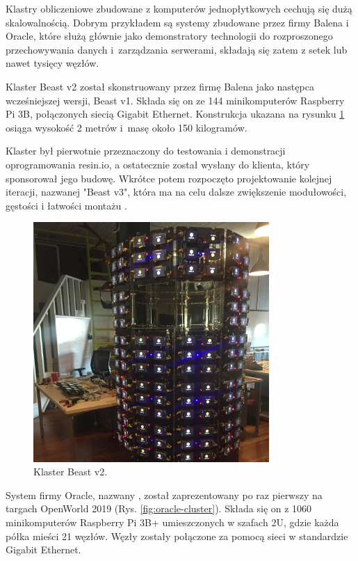 Klastry obliczeniowe zbudowane z komputerów jednopłytkowych cechują się dużą skalowalnością.
Dobrym przykładem są systemy zbudowane przez firmy Balena i Oracle, które służą głównie jako
demonstratory technologii do rozproszonego przechowywania danych i~zarządzania serwerami,
składają się zatem z setek lub nawet tysięcy węzłów.

Klaster Beast v2 został skonstruowany przez firmę Balena jako następca wcześniejszej wersji,
Beast v1. Składa się on ze 144 minikomputerów Raspberry Pi 3B, połączonych siecią Gigabit
Ethernet. Konstrukcja ukazana na rysunku \ref{fig:balena-cluster} osiąga wysokość 2 metrów
i~masę około 150 kilogramów.

Klaster był pierwotnie przeznaczony do testowania i demonstracji oprogramowania resin.io,
a ostatecznie został wysłany do klienta, który sponsorował jego budowę. Wkrótce potem
rozpoczęto projektowanie kolejnej iteracji, nazwanej "Beast v3", która ma na celu dalsze
zwiększenie modułowości, gęstości i łatwości montażu \cite{balena-cluster}.
\newpage

\begin{figure}
      \centering
      \includegraphics[width=0.8\textwidth]{graf/Balena.jpg}
      \caption {
            Klaster Beast v2. \cite{balena-cluster}
      }
      \label{fig:balena-cluster}
\end{figure}

System firmy Oracle, nazwany , został zaprezentowany po raz
pierwszy na targach OpenWorld 2019 (Rys. \ref{fig:oracle-cluster}). Składa się on z 1060
minikomputerów Raspberry Pi 3B+ umieszczonych w szafach 2U, gdzie każda półka mieści 21 węzłów.
Węzły zostały połączone za pomocą sieci w standardzie Gigabit Ethernet.


